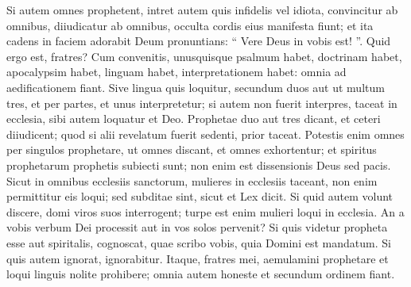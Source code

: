 \begin{biblechapter}
\begin{biblechapter}
\begin{biblechapter}
\begin{biblechapter}
\begin{biblechapter}
\begin{biblechapter}
\begin{biblechapter}
\begin{biblechapter}
\begin{biblechapter}
\begin{biblechapter}
\begin{biblechapter}
\begin{biblechapter}
\begin{biblechapter}
\begin{biblechapter}
\verse Si autem omnes prophetent, intret autem quis infidelis vel idiota, convincitur ab omnibus, diiudicatur ab omnibus, 
\verse occulta cordis eius manifesta fiunt; et ita cadens in faciem adorabit Deum pronuntians: “ Vere Deus in vobis est! ”.
 \verse Quid ergo est, fratres? Cum convenitis, unusquisque psalmum habet, doctrinam habet, apocalypsim habet, linguam habet, interpretationem habet: omnia ad aedificationem fiant. 
\verse Sive lingua quis loquitur, secundum duos aut ut multum tres, et per partes, et unus interpretetur; 
\verse si autem non fuerit interpres, taceat in ecclesia, sibi autem loquatur et Deo. 
\verse Prophetae duo aut tres dicant, et ceteri diiudicent; 
\verse quod si alii revelatum fuerit sedenti, prior taceat. 
\verse Potestis enim omnes per singulos prophetare, ut omnes discant, et omnes exhortentur; 
\verse et spiritus prophetarum prophetis subiecti sunt; 
\verse non enim est dissensionis Deus sed pacis.
 Sicut in omnibus ecclesiis sanctorum, 
\verse mulieres in ecclesiis taceant, non enim permittitur eis loqui; sed subditae sint, sicut et Lex dicit. 
\verse Si quid autem volunt discere, domi viros suos interrogent; turpe est enim mulieri loqui in ecclesia.
 \verse An a vobis verbum Dei processit aut in vos solos pervenit? 
\verse Si quis videtur propheta esse aut spiritalis, cognoscat, quae scribo vobis, quia Domini est mandatum. \verse Si quis autem ignorat, ignorabitur. 
\verse Itaque, fratres mei, aemulamini prophetare et loqui linguis nolite prohibere; 
\verse omnia autem honeste et secundum ordinem fiant.
 

\end{biblechapter}
\end{biblechapter}
\end{biblechapter}
\end{biblechapter}
\end{biblechapter}
\end{biblechapter}
\end{biblechapter}
\end{biblechapter}
\end{biblechapter}
\end{biblechapter}
\end{biblechapter}
\end{biblechapter}
\end{biblechapter}
\end{biblechapter}
